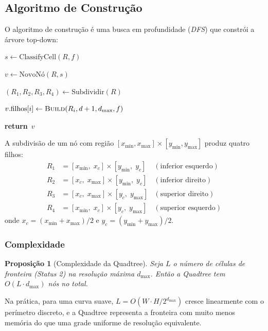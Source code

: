 \documentclass[11pt,a4paper]{article}
\newenvironment{algorithmic}[1][0]{%
    \begin{list}{}{%
        \setlength{\leftmargin}{1.5em}%
        \setlength{\labelsep}{0pt}%
        \setlength{\itemsep}{0pt}%
        \setlength{\topsep}{0pt}%
        \setlength{\parsep}{0pt}%
        \setlength{\partopsep}{0pt}%
    }%
}{%
    \end{list}%
}
\newcommand{\State}{\item[]}
\newcommand{\Procedure}[2]{\item[\textbf{procedure} #1(#2)]}
\newcommand{\EndProcedure}{\item[\textbf{end procedure}]}
\newcommand{\If}[1]{\item[\textbf{if} #1 \textbf{then}]}
\newcommand{\EndIf}{\item[\textbf{end if}]}
\newcommand{\For}[1]{\item[\textbf{for} #1 \textbf{do}]}
\newcommand{\EndFor}{\item[\textbf{end for}]}
\newcommand{\Return}{\textbf{return}~}
\newcommand{\Call}[2]{\textsc{#1}(#2)}
\theoremstyle{plain}
\newtheorem{proposition}[theorem]{Proposição}
\theoremstyle{definition}
\begin{document}
\subsection{Algoritmo de Construção}

O algoritmo de construção é uma busca em profundidade (\textit{DFS}) que
constrói a árvore top-down:

\begin{algorithm}[H]
\caption{Construção da Quadtree}
\begin{algorithmic}[1]
\Procedure{Build}{$R$, $d$, $d_{\max}$, $f$}
    \State $s \gets \text{ClassifyCell}(R, f)$
    \State $v \gets \text{NovoNó}(R, s)$
    \If{$s = 2$ \textbf{and} $d < d_{\max}$}
        \State $(R_1, R_2, R_3, R_4) \gets \text{Subdividir}(R)$
        \For{$i = 1, 2, 3, 4$}
            \State $v.\text{filhos}[i] \gets \Call{Build}{R_i, d+1, d_{\max}, f}$
        \EndFor
    \EndIf
    \State \Return $v$
\EndProcedure
\end{algorithmic}
\end{algorithm}

A subdivisão de um nó com região $[x_{\min}, x_{\max}] \times [y_{\min}, y_{\max}]$
produz quatro filhos:
\begin{align*}
    R_1 &= [x_{\min},\; x_c] \times [y_{\min},\; y_c]
        & (\text{inferior esquerdo}) \\
    R_2 &= [x_c,\; x_{\max}] \times [y_{\min},\; y_c]
        & (\text{inferior direito}) \\
    R_3 &= [x_c,\; x_{\max}] \times [y_c,\; y_{\max}]
        & (\text{superior direito}) \\
    R_4 &= [x_{\min},\; x_c] \times [y_c,\; y_{\max}]
        & (\text{superior esquerdo})
\end{align*}
onde $x_c = (x_{\min} + x_{\max})/2$ e $y_c = (y_{\min} + y_{\max})/2$.

\subsubsection{Complexidade}

\begin{proposition}[Complexidade da Quadtree]
Seja $L$ o número de células de fronteira (Status 2) na resolução máxima
$d_{\max}$. Então a Quadtree tem $O(L \cdot d_{\max})$ nós no total.
\end{proposition}

Na prática, para uma curva suave, $L = O(W \cdot H / 2^{d_{\max}})$ cresce
linearmente com o perímetro discreto, e a Quadtree representa a fronteira com
muito menos memória do que uma grade uniforme de resolução equivalente.
\end{document}
